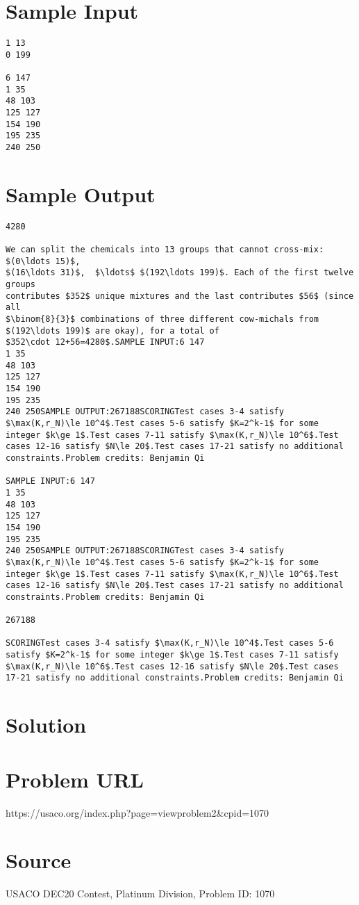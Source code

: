 \documentclass[12pt]{article}
\begin{document}
\section*{Sample Input}
\begin{verbatim}
1 13
0 199

6 147
1 35
48 103
125 127
154 190
195 235
240 250
\end{verbatim}

\section*{Sample Output}
\begin{verbatim}
4280

We can split the chemicals into 13 groups that cannot cross-mix: $(0\ldots 15)$,
$(16\ldots 31)$,  $\ldots$ $(192\ldots 199)$. Each of the first twelve groups
contributes $352$ unique mixtures and the last contributes $56$ (since all
$\binom{8}{3}$ combinations of three different cow-michals from
$(192\ldots 199)$ are okay), for a total of
$352\cdot 12+56=4280$.SAMPLE INPUT:6 147
1 35
48 103
125 127
154 190
195 235
240 250SAMPLE OUTPUT:267188SCORINGTest cases 3-4 satisfy $\max(K,r_N)\le 10^4$.Test cases 5-6 satisfy $K=2^k-1$ for some integer $k\ge 1$.Test cases 7-11 satisfy $\max(K,r_N)\le 10^6$.Test cases 12-16 satisfy $N\le 20$.Test cases 17-21 satisfy no additional constraints.Problem credits: Benjamin Qi

SAMPLE INPUT:6 147
1 35
48 103
125 127
154 190
195 235
240 250SAMPLE OUTPUT:267188SCORINGTest cases 3-4 satisfy $\max(K,r_N)\le 10^4$.Test cases 5-6 satisfy $K=2^k-1$ for some integer $k\ge 1$.Test cases 7-11 satisfy $\max(K,r_N)\le 10^6$.Test cases 12-16 satisfy $N\le 20$.Test cases 17-21 satisfy no additional constraints.Problem credits: Benjamin Qi

267188

SCORINGTest cases 3-4 satisfy $\max(K,r_N)\le 10^4$.Test cases 5-6 satisfy $K=2^k-1$ for some integer $k\ge 1$.Test cases 7-11 satisfy $\max(K,r_N)\le 10^6$.Test cases 12-16 satisfy $N\le 20$.Test cases 17-21 satisfy no additional constraints.Problem credits: Benjamin Qi
\end{verbatim}

\section*{Solution}


\section*{Problem URL}
https://usaco.org/index.php?page=viewproblem2&cpid=1070

\section*{Source}
USACO DEC20 Contest, Platinum Division, Problem ID: 1070
\end{document}
